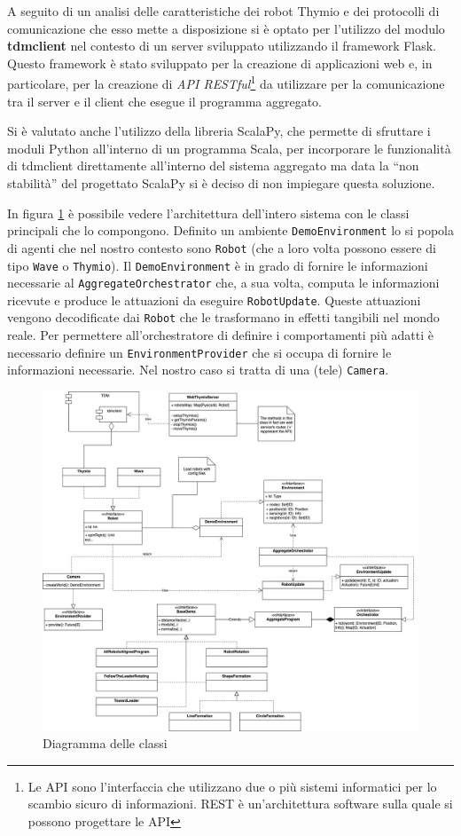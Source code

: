 \documentclass[12pt,a4paper,openright,twoside]{book}
\begin{document}
A seguito di un analisi delle caratteristiche dei robot Thymio e dei protocolli di comunicazione che esso mette a disposizione si è optato per l'utilizzo del modulo \textbf{tdmclient} nel contesto di un server sviluppato utilizzando il framework Flask. Questo framework è stato sviluppato per la creazione di applicazioni web e, in particolare, per la creazione di \textit{API RESTful}\footnote{Le API sono l'interfaccia che utilizzano due o più sistemi informatici per lo scambio sicuro di informazioni. REST è un'architettura software sulla quale si possono progettare le API} da utilizzare per la comunicazione tra il server e il client che esegue il programma aggregato. 

Si è valutato anche l'utilizzo della libreria ScalaPy, che permette di sfruttare i moduli Python all'interno di un programma Scala, per incorporare le funzionalità di tdmclient direttamente all'interno del sistema aggregato ma data la ``non stabilità'' del progettato ScalaPy si è deciso di non impiegare questa soluzione.

In figura \cref{fig:classi} è possibile vedere l'architettura dell'intero sistema con le classi principali che lo compongono. Definito un ambiente \verb|DemoEnvironment| lo si popola di agenti che nel nostro contesto sono \verb|Robot| (che a loro volta possono essere di tipo \verb|Wave| o \verb|Thymio|). Il \verb|DemoEnvironment| è in grado di fornire le informazioni necessarie al \verb|AggregateOrchestrator| che, a sua volta, computa le informazioni ricevute e produce le attuazioni da eseguire \verb|RobotUpdate|. Queste attuazioni vengono decodificate dai \verb|Robot| che le trasformano in effetti tangibili nel mondo reale. Per permettere all'orchestratore di definire i comportamenti più adatti è necessario definire un \verb|EnvironmentProvider| che si occupa di fornire le informazioni necessarie. Nel nostro caso si tratta di una (tele) \verb|Camera|.

\begin{figure}
    \centering
    \includegraphics[width=.99\linewidth]{figures/classi.jpg}
    \caption{Diagramma delle classi}
    \label{fig:classi}
\end{figure}
\end{document}
